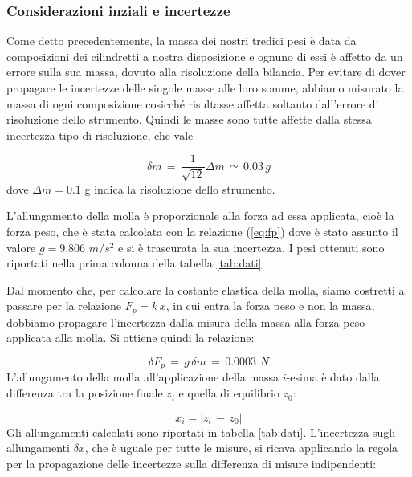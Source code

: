 \subsubsection{Considerazioni inziali e incertezze}
\label{incertezze}

Come detto precedentemente, la massa dei nostri tredici pesi è data da composizioni dei cilindretti a nostra disposizione e ognuno di essi è affetto da un errore sulla sua massa, dovuto alla risoluzione della bilancia. Per evitare di dover propagare le incertezze delle singole masse alle loro somme, abbiamo misurato la massa di ogni composizione cosicché risultasse affetta soltanto dall'errore di risoluzione dello strumento. Quindi le masse sono tutte affette dalla stessa incertezza tipo di risoluzione, che vale

\begin{equation*}
	\delta m \,=\, \frac{1}{\sqrt{12}}\Delta m \,\simeq\, 0.03 \,g 
\end{equation*}
%
dove $\Delta m = 0.1$ g indica la risoluzione dello strumento.

L'allungamento della molla è proporzionale alla forza ad essa applicata, cioè la forza peso, che è stata calcolata con la relazione (\ref{eq:fp})
dove è stato assunto il valore $g = 9.806 \,\, m/s^2$ e si è trascurata la sua incertezza. I pesi ottenuti sono riportati nella
prima colonna della tabella \ref{tab:dati}.

Dal momento che, per calcolare la costante elastica della molla, siamo costretti a passare per la relazione $F_p = k\,x$, in cui entra la forza peso e non la massa, dobbiamo propagare l'incertezza dalla misura della massa alla forza peso applicata alla molla. Si ottiene quindi la relazione:

\begin{equation*}
	\delta F_{p}\, =\, g\,\delta m \,=\, 0.0003 \,\, N 
\end{equation*}
%
L'allungamento della molla all'applicazione della massa $i$-esima è dato dalla differenza tra la posizione finale $z_i$ e quella di equilibrio $z_0$:

\begin{equation*}
	x_i = |z_i\,-\,z_0|
\end{equation*}
%
Gli allungamenti calcolati sono riportati in tabella \ref{tab:dati}. L’incertezza sugli allungamenti $\delta x$, che è uguale per tutte le misure, si ricava applicando la regola per la propagazione delle incertezze sulla differenza di misure indipendenti:

